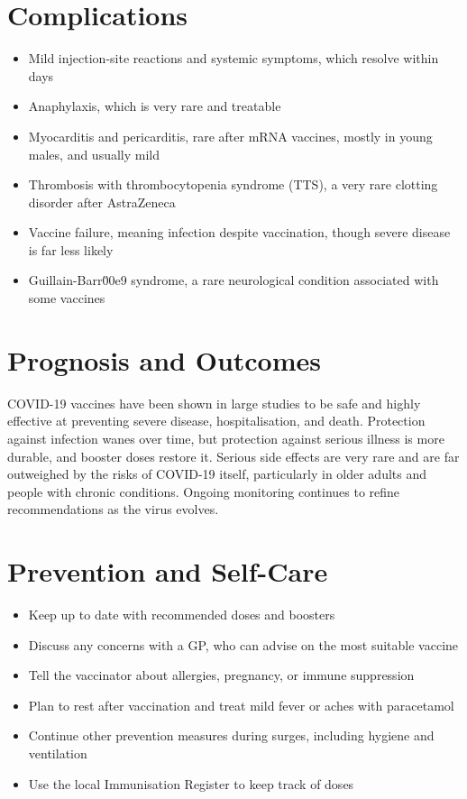 \section*{Complications}
\begin{itemize}
    \item Mild injection-site reactions and systemic symptoms, which resolve within days
    \item Anaphylaxis, which is very rare and treatable
    \item Myocarditis and pericarditis, rare after mRNA vaccines, mostly in young males, and usually mild
    \item Thrombosis with thrombocytopenia syndrome (TTS), a very rare clotting disorder after AstraZeneca
    \item Vaccine failure, meaning infection despite vaccination, though severe disease is far less likely
    \item Guillain-Barr\u00e9 syndrome, a rare neurological condition associated with some vaccines
\end{itemize}

\section*{Prognosis and Outcomes}
COVID-19 vaccines have been shown in large studies to be safe and highly effective at preventing severe disease, hospitalisation, and death. Protection against infection wanes over time, but protection against serious illness is more durable, and booster doses restore it. Serious side effects are very rare and are far outweighed by the risks of COVID-19 itself, particularly in older adults and people with chronic conditions. Ongoing monitoring continues to refine recommendations as the virus evolves.

\section*{Prevention and Self-Care}
\begin{itemize}
    \item Keep up to date with recommended doses and boosters
    \item Discuss any concerns with a GP, who can advise on the most suitable vaccine
    \item Tell the vaccinator about allergies, pregnancy, or immune suppression
    \item Plan to rest after vaccination and treat mild fever or aches with paracetamol
    \item Continue other prevention measures during surges, including hygiene and ventilation
    \item Use the local Immunisation Register to keep track of doses
\end{itemize}

